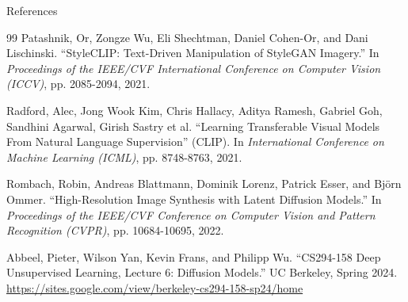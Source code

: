 \begin{frame}[allowframebreaks]{References}
\begin{thebibliography}{99}
    Patashnik, Or, Zongze Wu, Eli Shechtman, Daniel Cohen-Or, and Dani Lischinski. ``StyleCLIP: Text-Driven Manipulation of StyleGAN Imagery.'' In \textit{Proceedings of the IEEE/CVF International Conference on Computer Vision (ICCV)}, pp. 2085-2094, 2021.

    Radford, Alec, Jong Wook Kim, Chris Hallacy, Aditya Ramesh, Gabriel Goh, Sandhini Agarwal, Girish Sastry et al. ``Learning Transferable Visual Models From Natural Language Supervision'' (CLIP). In \textit{International Conference on Machine Learning (ICML)}, pp. 8748-8763, 2021.

    Rombach, Robin, Andreas Blattmann, Dominik Lorenz, Patrick Esser, and Björn Ommer. ``High-Resolution Image Synthesis with Latent Diffusion Models.'' In \textit{Proceedings of the IEEE/CVF Conference on Computer Vision and Pattern Recognition (CVPR)}, pp. 10684-10695, 2022.

    Abbeel, Pieter, Wilson Yan, Kevin Frans, and Philipp Wu. ``CS294-158 Deep Unsupervised Learning, Lecture 6: Diffusion Models.'' UC Berkeley, Spring 2024. \url{https://sites.google.com/view/berkeley-cs294-158-sp24/home}

    \end{thebibliography}
\end{frame}
